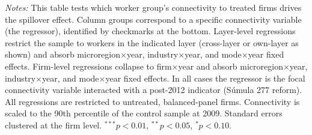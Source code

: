 \begin{table}[H]
{\begin{tabular}{lcccccccccccccccccc}
\bottomrule
\end{tabular}}
\begin{minipage}{\linewidth}
\scriptsize\vspace{4pt}
\textit{Notes:} This table tests which worker group's connectivity to treated firms drives the spillover effect. Column groups correspond to a specific connectivity variable (the regressor), identified by checkmarks at the bottom. Layer-level regressions restrict the sample to workers in the indicated layer (cross-layer or own-layer as shown) and absorb microregion$\times$year, industry$\times$year, and mode$\times$year fixed effects. Firm-level regressions collapse to firm$\times$year and absorb microregion$\times$year, industry$\times$year, and mode$\times$year fixed effects. In all cases the regressor is the focal connectivity variable interacted with a post-2012 indicator (S\'{u}mula 277 reform). All regressions are restricted to untreated, balanced-panel firms. Connectivity is scaled to the 90th percentile of the control sample at 2009. Standard errors clustered at the firm level. $^{***}p<0.01$, $^{**}p<0.05$, $^{*}p<0.10$.
\end{minipage}
\end{table}